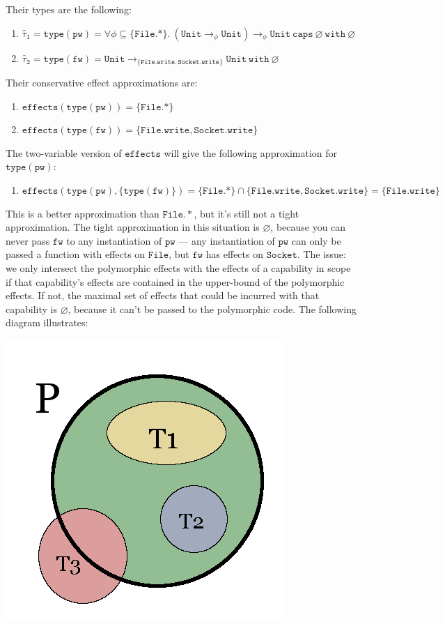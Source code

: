 \documentclass{llncs}
\newcommand{\keywadj}[1]{\mathtt{#1}}
\newcommand{\kwa}[1]{\keywadj{ #1 }}
\begin{document}
\noindent
Their types are the following:

\begin{enumerate}
	\item $\kwa{\hat \tau_1 = type(pw) = \forall \phi \subseteq \{ File.* \}.~(Unit \rightarrow_{\phi} Unit) \rightarrow_{\phi} Unit~caps~\varnothing~with~\varnothing}$
	\item $\kwa{\hat \tau_2 = type(fw) = Unit \rightarrow_{\{File.write, Socket.write\}} Unit~with~\varnothing}$
\end{enumerate}

\noindent
Their conservative effect approximations are:

\begin{enumerate}
	\item $\kwa{effects(type(pw)) = \{File.*\} }$
	\item $\kwa{effects(type(fw)) = \{File.write, Socket.write\} }$
\end{enumerate}

\noindent
The two-variable version of $\kwa{effects}$ will give the following approximation for $\kwa{type(pw)}$:

\begin{enumerate}
	\item $\kwa{effects(type(pw), \{ type(fw) \}) = \{File.*\} \cap \{File.write, Socket.write\} = \{File.write\}}$
\end{enumerate}

\noindent
This is a better approximation than $\kwa{File.*}$, but it's still not a tight approximation. The tight approximation in this situation is $\varnothing$, because you can never pass $\kwa{fw}$ to any instantiation of $\kwa{pw}$ --- any instantiation of $\kwa{pw}$ can only be passed a function with effects on $\kwa{File}$, but $\kwa{fw}$ has effects on $\kwa{Socket}$. The issue: we only intersect the polymorphic effects with the effects of a capability in scope if that capability's effects are contained in the upper-bound of the polymorphic effects. If not, the maximal set of effects that could be incurred with that capability is $\varnothing$, because it can't be passed to the polymorphic code. The following diagram illustrates:


\includegraphics{effects}
\end{document}

